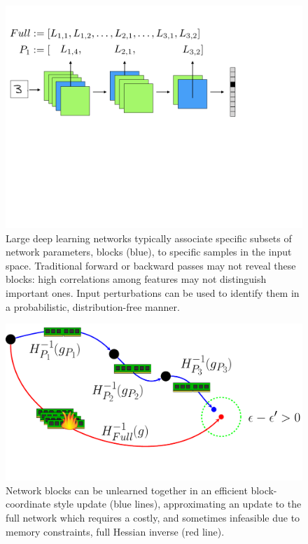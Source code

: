\begin{figure}
    \centering
    \includegraphics[width=\columnwidth,trim={0cm 12cm 5cm 2.5cm},clip]{5_unlearn/figs/layercnn.png}
    \caption[Conditionally independent network subsets]{\label{fig:main1} Large deep learning networks typically associate specific subsets of network parameters, blocks (blue), to specific samples in the input space.
    Traditional forward or backward passes may not reveal these blocks: high correlations among features may not distinguish important ones. Input perturbations can be used to identify them in a probabilistic, distribution-free manner.}
\end{figure}
\begin{figure}
	\centering
	\includegraphics[width=\columnwidth,trim={0cm 1cm 0cm 0cm},clip]{5_unlearn/figs/unlearning_fig.pdf}
	\caption[Efficient unlearning]{\label{fig:main2}Network blocks can be unlearned together in an efficient block-coordinate style update (blue lines), approximating an update to the full network which requires a costly, and sometimes infeasible due to memory constraints, full Hessian inverse (red line).}
\end{figure}

